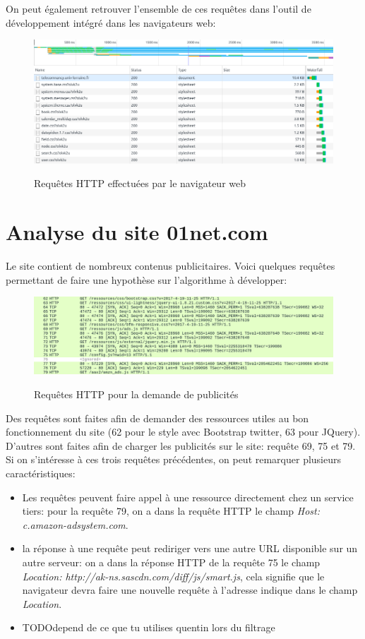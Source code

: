 \documentclass[a4paper,11pt, oneside]{book}
\def\widthImage{1}
\def\todo{{\color{red}\Huge{TODO}}}
\begin{document}
		On peut également retrouver l'ensemble de ces requêtes dans l'outil de développement intégré dans les navigateurs web:

		\begin{figure} [htbp]
			\centering
			\includegraphics[width=\widthImage\textwidth]{3.png}\\
			\caption{Requêtes HTTP effectuées par le navigateur web}
		\end{figure}


	\clearpage
	\section{Analyse du site 01net.com}
		Le site contient de nombreux contenus publicitaires. Voici quelques requêtes permettant
		de faire une hypothèse sur l'algorithme à développer:

		\begin{figure} [htbp]
			\centering
			\includegraphics[width=\widthImage\textwidth]{4.png}\\
			\caption{Requêtes HTTP pour la demande de publicités}
		\end{figure}

		Des requêtes sont faites afin de demander des ressources utiles au bon fonctionnement du site (62 pour le style avec Bootstrap twitter, 63 pour JQuery).
		D'autres sont faites afin de charger les publicités sur le site: requête 69, 75 et 79.
		Si on s'intéresse à ces trois requêtes précédentes, on peut remarquer plusieurs caractéristiques:
		\begin{itemize}
			\item Les requêtes peuvent faire appel à une ressource directement chez un service tiers: pour la requête 79,
			on a dans la requête HTTP le champ  \textit{Host: c.amazon-adsystem.com}.
			\item la réponse à une requête peut rediriger vers une autre URL disponible sur un autre serveur:
			on a dans la réponse HTTP de la requête 75 le champ \textit{Location: http://ak-ns.sascdn.com/diff/js/smart.js}, cela
			signifie que le navigateur devra faire une nouvelle requête à l'adresse indique dans le champ \textit{Location}.
			\item \todo depend de ce que tu utilises quentin lors du filtrage
		\end{itemize}
\end{document}
